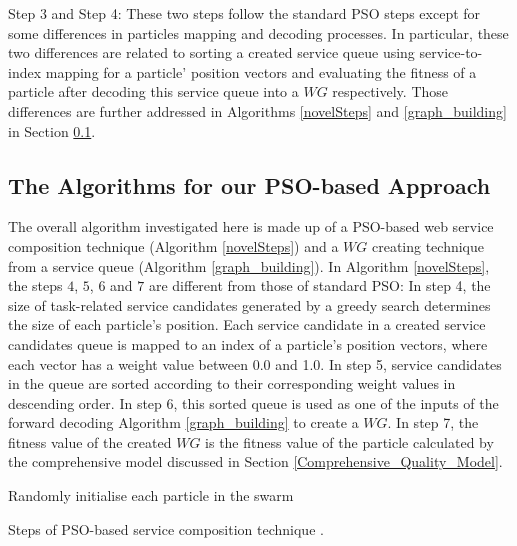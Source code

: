 \documentclass{llncs}
\begin{document}
Step 3 and Step 4: These two steps follow the standard PSO steps \cite{shi2001particle} except for some differences in particles mapping and decoding processes. In particular, these two differences are related to sorting a created service queue using service-to-index mapping for a particle' position vectors and evaluating the fitness of a particle after decoding this service queue into a $WG$ respectively. Those differences are further addressed in Algorithms \ref{novelSteps} and \ref{graph_building} in Section \ref{POS-based_algomargin}.

\subsection{The Algorithms for our PSO-based Approach}\label{POS-based_algomargin}
The overall algorithm investigated here is made up of a PSO-based web service composition technique (Algorithm \ref{novelSteps}) and a $WG$ creating technique from a service queue (Algorithm \ref{graph_building}). In Algorithm \ref{novelSteps}, the  steps $4$, $5$, $6$ and $7$ are different from those of standard PSO: In step 4, the size of task-related service candidates generated by a greedy search determines the size of each particle's position. Each service candidate in a created service candidates queue is mapped to an index of a particle’s position vectors, where each vector has a weight value between 0.0 and 1.0. In step 5, service candidates in the queue are sorted according to their corresponding weight values in descending order. In step 6, this sorted queue is used as one of the inputs of the forward decoding Algorithm \ref{graph_building} to create a $WG$. In step 7, the fitness value of the created $WG$ is the fitness value of the particle calculated by the comprehensive model discussed in Section \ref{Comprehensive_Quality_Model}.
\vspace{-0.5cm}
\begin{algorithm}
 \SetNlSty{}{}{:}
 Randomly initialise each particle in the swarm\;
\caption{Steps of PSO-based service composition technique \cite{da2016particle}.}
\label{novelSteps}
\end{algorithm} 
\end{document}
